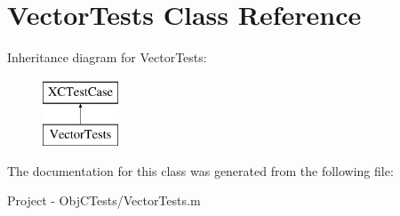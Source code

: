 \hypertarget{interface_vector_tests}{}\section{Vector\+Tests Class Reference}
\label{interface_vector_tests}
Inheritance diagram for Vector\+Tests\+:\begin{figure}[H]
\begin{center}
\leavevmode
\includegraphics[height=2.000000cm]{interface_vector_tests}
\end{center}
\end{figure}


The documentation for this class was generated from the following file\+:\begin{DoxyCompactItemize}
\item 
Project -\/ Obj\+C\+Tests/Vector\+Tests.\+m\end{DoxyCompactItemize}
